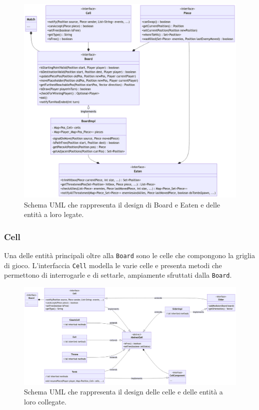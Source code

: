 \documentclass[a4paper,12pt]{report}
\begin{document}
\begin{figure}[H]
\centering
\includegraphics[width=\textwidth]{images/board-and-eaten.png}
\caption{Schema UML che rappresenta il design di Board e Eaten e delle entità a loro legate.}
\label{images:board-and-eaten}
\end{figure}

\subsubsection{Cell}

Una delle entità principali oltre alla \texttt{Board} sono le celle che compongono la griglia di gioco. 
L'interfaccia \texttt{Cell} modella le varie celle e presenta metodi che permettono di interrogarle e di settarle, ampiamente sfruttati dalla  \texttt{Board}.

\begin{figure}[H]
\centering
\includegraphics[width=\textwidth]{images/cells.png}
\caption{Schema UML che rappresenta il design delle celle e delle entità a loro collegate.}
\label{images:cells}
\end{figure}
\end{document}
